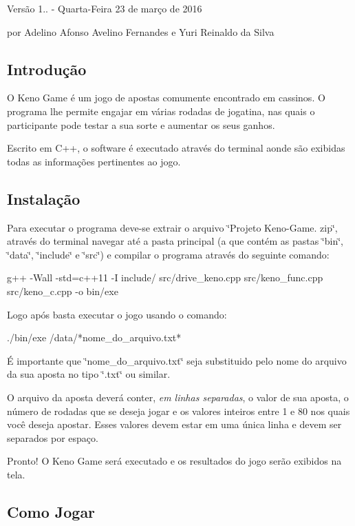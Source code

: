Versão 1.. -\/ Quarta-\/\+Feira 23 de março de 2016

por Adelino Afonso Avelino Fernandes e Yuri Reinaldo da Silva

\subsection*{Introdução }

O Keno Game é um jogo de apostas comumente encontrado em cassinos. O programa lhe permite engajar em várias rodadas de jogatina, nas quais o participante pode testar a sua sorte e aumentar os seus ganhos.

Escrito em C++, o software é executado através do terminal aonde são exibidas todas as informações pertinentes ao jogo.

\subsection*{Instalação }

Para executar o programa deve-\/se extrair o arquivo \char`\"{}\+Projeto Keno-\/\+Game.
zip\char`\"{}, através do terminal navegar até a pasta principal (a que contém as pastas \char`\"{}bin\char`\"{}, \char`\"{}data\char`\"{}, \char`\"{}include\char`\"{} e \char`\"{}src\char`\"{}) e compilar o programa através do seguinte comando\+: \begin{DoxyVerb}g++ -Wall -std=c++11 -I include/ src/drive_keno.cpp src/keno_func.cpp  src/keno_c.cpp -o bin/exe
\end{DoxyVerb}


Logo após basta executar o jogo usando o comando\+: \begin{DoxyVerb}./bin/exe /data/*nome_do_arquivo.txt*
\end{DoxyVerb}


É importante que \char`\"{}nome\+\_\+do\+\_\+arquivo.\+txt\char`\"{} seja substituido pelo nome do arquivo da sua aposta no tipo \char`\"{}.\+txt\char`\"{} ou similar.

O arquivo da aposta deverá conter, {\itshape em linhas separadas}, o valor de sua aposta, o número de rodadas que se deseja jogar e os valores inteiros entre 1 e 80 nos quais você deseja apostar. Esses valores devem estar em uma única linha e devem ser separados por espaço.

Pronto! O Keno Game será executado e os resultados do jogo serão exibidos na tela.

\subsection*{Como Jogar }

